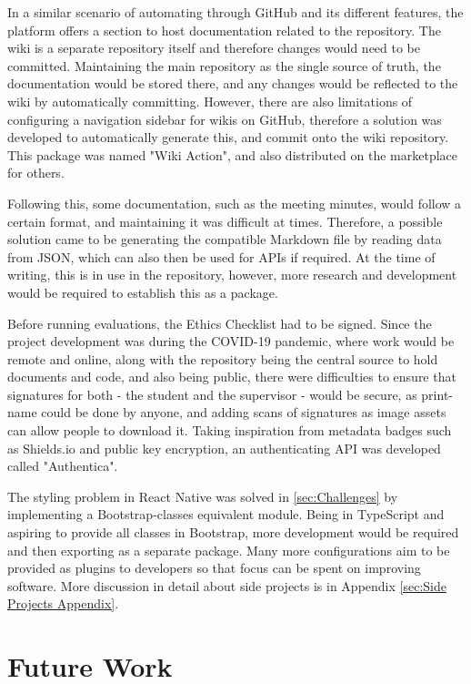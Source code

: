 \documentclass[../main.tex]{subfiles}
\begin{document}
In a similar scenario of automating through GitHub and its different features, the platform offers a section to host documentation related to the repository. The wiki is a separate repository itself and therefore changes would need to be committed. Maintaining the main repository as the single source of truth, the documentation would be stored there, and any changes would be reflected to the wiki by automatically committing. However, there are also limitations of configuring a navigation sidebar for wikis on GitHub, therefore a solution was developed to automatically generate this, and commit onto the wiki repository. This package was named "Wiki Action", and also distributed on the marketplace for others.

Following this, some documentation, such as the meeting minutes, would follow a certain format, and maintaining it was difficult at times. Therefore, a possible solution came to be generating the compatible Markdown file by reading data from JSON, which can also then be used for APIs if required. At the time of writing, this is in use in the repository, however, more research and development would be required to establish this as a package.

Before running evaluations, the Ethics Checklist had to be signed. Since the project development was during the COVID-19 pandemic, where work would be remote and online, along with the repository being the central source to hold documents and code, and also being public, there were difficulties to ensure that signatures for both - the student and the supervisor - would be secure, as print-name could be done by anyone, and adding scans of signatures as image assets can allow people to download it. Taking inspiration from metadata badges such as Shields.io and public key encryption, an authenticating API was developed called "Authentica".

The styling problem in React Native was solved in \ref{sec:Challenges} by implementing a Bootstrap-classes equivalent module. Being in TypeScript and aspiring to provide all classes in Bootstrap, more development would be required and then exporting as a separate package. Many more configurations aim to be provided as plugins to developers so that focus can be spent on improving software. More discussion in detail about side projects is in Appendix \ref{sec:Side Projects Appendix}.

\section{Future Work}
\end{document}

